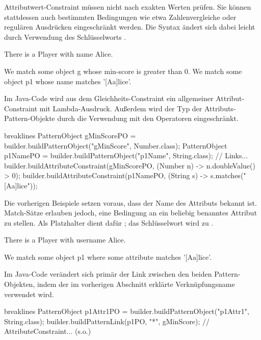 Attributwert-Constraint müssen nicht nach exakten Werten prüfen.
Sie können stattdessen auch bestimmten Bedingungen wie etwa Zahlenvergleiche oder regulären Ausdrücken eingeschränkt werden.
Die Syntax ändert sich dabei leicht durch Verwendung des Schlüsselworts .

\begin{mdcodeblock}
    There is a Player with name Alice.

    We match some object g whose min-score is greater than 0.
    We match some object p1 whose name matches '[Aa]lice'.
\end{mdcodeblock}

Im Java-Code wird aus dem Gleichheits-Constraint ein allgemeiner Attribut-Constraint mit Lambda-Ausdruck.
Außerdem wird der Typ der Attributs-Pattern-Objekte durch die Verwendung mit den Operatoren eingeschränkt.

\begin{jcodeblock*}{breaklines}
    PatternObject gMinScorePO = builder.buildPatternObject("gMinScore", Number.class);
    PatternObject p1NamePO = builder.buildPatternObject("p1Name", String.class);
    // Links...
    builder.buildAttributeConstraint(gMinScorePO, (Number n) -> n.doubleValue() > 0);
    builder.buildAttributeConstraint(p1NamePO, (String s) -> s.matches("[Aa]lice"));
\end{jcodeblock*}

Die vorherigen Beispiele setzen voraus, dass der Name des Attributs bekannt ist.
Match-Sätze erlauben jedoch, eine Bedingung an ein beliebig benanntes Attribut zu stellen.
Als Platzhalter dient dafür ;
das Schlüsselwort  wird zu .

\begin{mdcodeblock}
    There is a Player with username Alice.

    We match some object p1 where some attribute matches '[Aa]lice'.
\end{mdcodeblock}

Im Java-Code verändert sich primär der Link zwischen den beiden Pattern-Objekten,
indem der im vorherigen Abschnitt erklärte Verknüpfungsname \code{*} verwendet wird.

\begin{jcodeblock*}{breaklines}
    PatternObject p1Attr1PO = builder.buildPatternObject("p1Attr1", String.class);
    builder.buildPatternLink(p1PO, "*", gMinScore);
    // AttributeConstraint... (s.o.)
\end{jcodeblock*}

